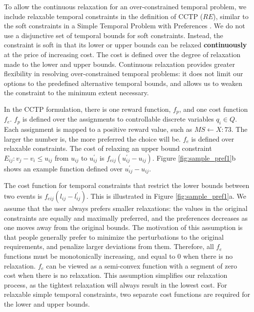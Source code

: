 \documentclass[jair,twoside,11pt,theapa]{article}
\begin{document}

To allow the continuous relaxation for an over-constrained temporal problem, we
include relaxable temporal constraints in the definition of CCTP ($RE$), similar
to the soft constraints in a Simple Temporal Problem with Preferences
\cite{Rossi_STPP_2002}. We do not use a disjunctive set of temporal bounds for
soft constraints. Instead, the constraint is soft in that its lower or upper
bounds can be relaxed \textbf{continuously} at the price of increasing cost. The
cost is defined over the degree of relaxation made to the lower and upper
bounds. Continuous relaxation provides greater flexibility in resolving
over-constrained temporal problems: it does not limit our options to the
predefined alternative temporal bounds, and allows us to weaken the constraint
to the minimum extent necessary.


In the CCTP formulation, there is one reward function, $f_p$, and one cost
function $f_e$. $f_p$ is defined over the assignments to controllable discrete
variables $q_i\in Q$. Each assignment is mapped to a positive reward value, such
as $MS \leftarrow X:73$. The larger the number is, the more preferred the choice
will be. $f_e$ is defined over relaxable constraints. The cost of relaxing an
upper bound constraint $E_{ij}:v_j-v_i\leq u_{ij}$ from $u_{ij}$ to
$u_{ij}^{\prime}$ is $f_{eij}(u_{ij}^{\prime}-u_{ij} )$. Figure
\ref{fig:sample_pref1}b shows an example function defined over
$u_{ij}^{\prime}-u_{ij}$.



The cost function for temporal constraints that restrict the lower bounds
between two events is $f_{eij}(l_{ij}-l_{ij}^{\prime})$. This is illustrated in
Figure \ref{fig:sample_pref1}a. We assume that the user always prefers smaller
relaxations: the values in the original constraints are equally and maximally
preferred, and the preferences decreases as one moves away from the original
bounds. The motivation of this assumption is that people generally prefer to
minimize the perturbations to the original requirements, and penalize larger
deviations from them. Therefore, all $f_e$ functions must be monotonically
increasing, and equal to 0 when there is no relaxation. $f_e$ can be viewed as a
semi-convex \cite{Khatib01temporalconstraint} function with a segment of zero
cost when there is no relaxation. This assumption simplifies our relaxation
process, as the tightest relaxation will always result in the lowest cost. For
relaxable simple temporal constraints, two separate cost functions are required
for the lower and upper bounds.
\end{document}
